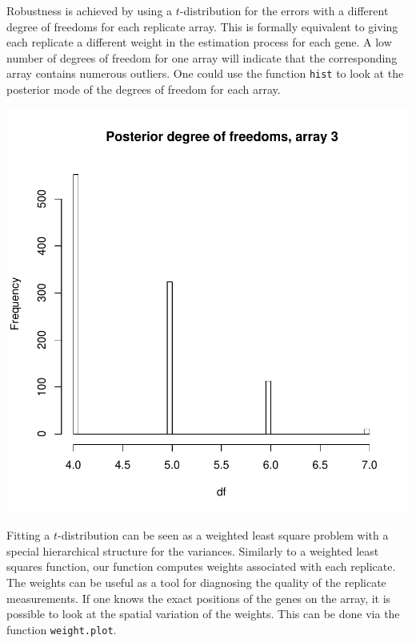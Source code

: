 \documentclass[11pt]{article}
\begin{document}
Robustness is achieved by using a $t$-distribution for the errors
with a different degree of freedoms for each replicate array. This is formally equivalent to giving each replicate 
a different weight in the estimation process for each gene. A low number of degrees of freedom for one array will indicate that
the corresponding array contains numerous outliers. One could use the function {\tt hist} to look at the posterior mode 
of the degrees of freedom for each array.

\begin{center} 
\begin{Schunk}
\end{Schunk}
\includegraphics{rama-histdf}
\end{center}

Fitting a $t$-distribution can be seen as a weighted least square problem with a special hierarchical structure for the variances.
Similarly to a weighted least squares function, our function computes weights associated with each replicate. 
The weights can be useful as a tool for diagnosing the quality of the replicate measurements. If one knows the exact positions of the genes on the array, it 
is possible to look at the spatial variation of the weights. This can be done via the function {\tt weight.plot}.
\end{document}
